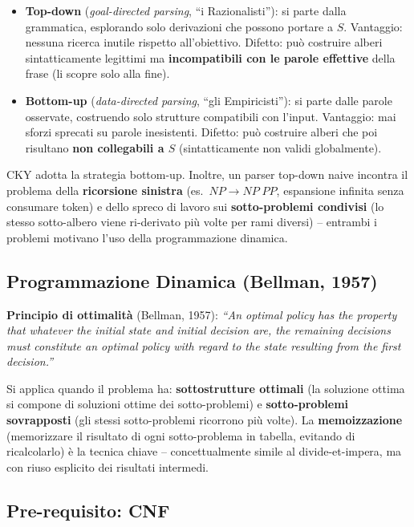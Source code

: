 \documentclass[12pt,a4paper]{article}
\begin{document}
\begin{itemize}[leftmargin=1.5em]
  \item \textbf{Top-down} (\emph{goal-directed parsing}, ``i Razionalisti''): si parte dalla grammatica, esplorando solo derivazioni che possono portare a $S$. Vantaggio: nessuna ricerca inutile rispetto all'obiettivo. Difetto: può costruire alberi sintatticamente legittimi ma \textbf{incompatibili con le parole effettive} della frase (li scopre solo alla fine).
  \item \textbf{Bottom-up} (\emph{data-directed parsing}, ``gli Empiricisti''): si parte dalle parole osservate, costruendo solo strutture compatibili con l'input. Vantaggio: mai sforzi sprecati su parole inesistenti. Difetto: può costruire alberi che poi risultano \textbf{non collegabili a $S$} (sintatticamente non validi globalmente).
\end{itemize}
CKY adotta la strategia bottom-up. Inoltre, un parser top-down naive incontra il problema della \textbf{ricorsione sinistra} (es.\ $NP \to NP\;PP$, espansione infinita senza consumare token) e dello spreco di lavoro sui \textbf{sotto-problemi condivisi} (lo stesso sotto-albero viene ri-derivato più volte per rami diversi) -- entrambi i problemi motivano l'uso della programmazione dinamica.

\subsection{Programmazione Dinamica (Bellman, 1957)}

\begin{defbox}
\textbf{Principio di ottimalità} (Bellman, 1957): \emph{``An optimal policy has the property that whatever the initial state and initial decision are, the remaining decisions must constitute an optimal policy with regard to the state resulting from the first decision.''}
\end{defbox}
Si applica quando il problema ha: \textbf{sottostrutture ottimali} (la soluzione ottima si compone di soluzioni ottime dei sotto-problemi) e \textbf{sotto-problemi sovrapposti} (gli stessi sotto-problemi ricorrono più volte). La \textbf{memoizzazione} (memorizzare il risultato di ogni sotto-problema in tabella, evitando di ricalcolarlo) è la tecnica chiave -- concettualmente simile al divide-et-impera, ma con riuso esplicito dei risultati intermedi.

\subsection{Pre-requisito: CNF}
\end{document}
